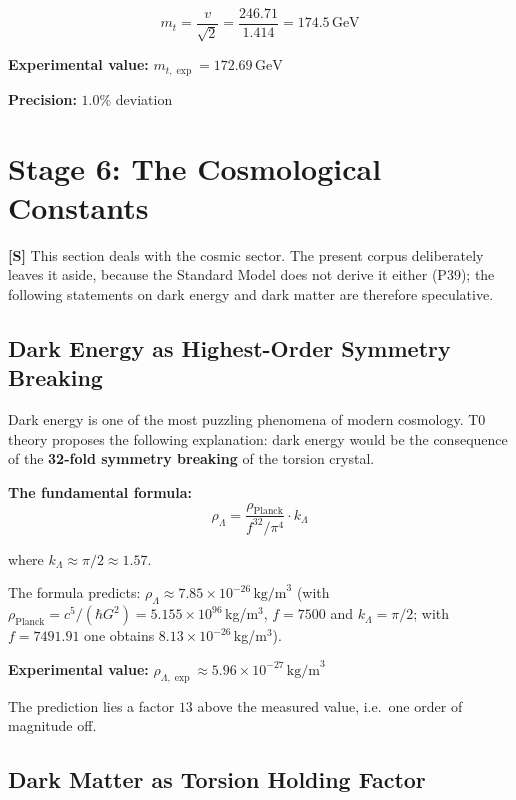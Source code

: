 	\begin{equation}
		\boxed{m_t = \frac{v}{\sqrt{2}} = \frac{246.71}{1.414} = 174.5\,\text{GeV}}
	\end{equation}
	
	\textbf{Experimental value:} \(m_{t,\exp} = 172.69\,\text{GeV}\)
	
	\textbf{Precision:} \(1.0\%\) deviation
	
	\section{Stage 6: The Cosmological Constants}

	\textbf{[S]} This section deals with the cosmic sector. The present corpus deliberately leaves it aside, because the Standard Model does not derive it either (P39); the following statements on dark energy and dark matter are therefore speculative.
	
	\subsection{Dark Energy as Highest-Order Symmetry Breaking}
	
	Dark energy is one of the most puzzling phenomena of modern cosmology. T0 theory proposes the following explanation: dark energy would be the consequence of the \textbf{32-fold symmetry breaking} of the torsion crystal.
	
	\textbf{The fundamental formula:}
	\begin{equation}
		\boxed{\rho_\Lambda = \frac{\rho_{\text{Planck}}}{f^{32} / \pi^4} \cdot k_\Lambda}
	\end{equation}
	
	where \(k_\Lambda \approx \pi/2 \approx 1.57\).
	
	The formula predicts: \(\rho_\Lambda \approx 7.85 \times 10^{-26}\,\text{kg/m}^3\) (with $\rho_{\text{Planck}} = c^5/(\hbar G^2) = 5.155\times10^{96}$\,kg/m$^3$, $f = 7500$ and $k_\Lambda = \pi/2$; with $f = 7491.91$ one obtains $8.13\times10^{-26}$\,kg/m$^3$).
	
	\textbf{Experimental value:} \(\rho_{\Lambda,\exp} \approx 5.96 \times 10^{-27}\,\text{kg/m}^3\)
	
	The prediction lies a factor $13$ above the measured value, i.e.\ one order of magnitude off.
	
	\subsection{Dark Matter as Torsion Holding Factor}
	
